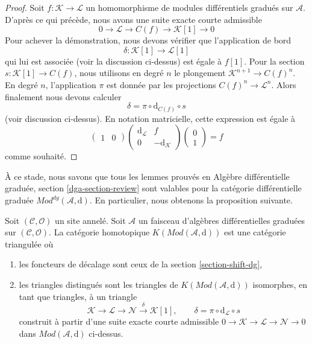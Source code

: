 \begin{proof}
Soit $f : \mathcal{K} \to \mathcal{L}$ un homomorphisme de modules différentiels gradués sur $\mathcal{A}$.
D'après ce qui précède, nous avons une suite exacte courte admissible
$$
0 \to \mathcal{L} \to C(f) \to \mathcal{K}[1] \to 0
$$
Pour achever la démonstration, nous devons vérifier que l'application de bord
$$
\delta : \mathcal{K}[1] \to \mathcal{L}[1]
$$
qui lui est associée (voir la discussion ci-dessus) est égale à $f[1]$.
Pour la section $s : \mathcal{K}[1] \to C(f)$, nous utilisons en degré $n$ le plongement $\mathcal{K}^{n + 1} \to C(f)^n$.
En degré $n$, l'application $\pi$ est donnée par les projections $C(f)^n \to \mathcal{L}^n$.
Alors finalement nous devons calculer
$$
\delta = \pi \circ \text{d}_{C(f)} \circ s
$$
(voir discussion ci-dessus).
En notation matricielle, cette expression est égale à
$$
\left(
\begin{matrix}
1 & 0
\end{matrix}
\right)
\left(
\begin{matrix}
\text{d}_\mathcal{L} & f \\
0 & -\text{d}_\mathcal{K}
\end{matrix}
\right)
\left(
\begin{matrix}
0 \\
1
\end{matrix}
\right) = f
$$
comme souhaité.
\end{proof}

\noindent
À ce stade, nous savons que tous les lemmes prouvés en Algèbre différentielle graduée, section \ref{dga-section-review}  sont valables pour la catégorie différentielle graduée $\textit{Mod}^{dg}(\mathcal{A}, \text{d})$.
En particulier, nous obtenons la proposition suivante.

\begin{proposition}
\label{proposition-homotopy-category-triangulated}
Soit $(\mathcal{C}, \mathcal{O})$ un site annelé.
Soit $\mathcal{A}$ un faisceau d'algèbres différentielles graduées sur $(\mathcal{C}, \mathcal{O})$.
La catégorie homotopique $K(\textit{Mod}(\mathcal{A}, \text{d}))$ est une catégorie triangulée où
\begin{enumerate}
\item les foncteurs de décalage sont ceux de la section \ref{section-shift-dg}, \item les triangles distingués sont les triangles de $K(\textit{Mod}(\mathcal{A}, \text{d}))$ isomorphes, en tant que triangles, à un triangle
$$
\mathcal{K} \to \mathcal{L} \to \mathcal{N}
\xrightarrow{\delta} \mathcal{K}[1],\quad\quad
\delta = \pi \circ \text{d}_\mathcal{L} \circ s
$$
construit à partir d'une suite exacte courte admissible $0 \to \mathcal{K} \to \mathcal{L} \to \mathcal{N} \to 0$ dans $\textit{Mod}(\mathcal{A}, \text{d})$ ci-dessus.
\end{enumerate}
\end{proposition}

